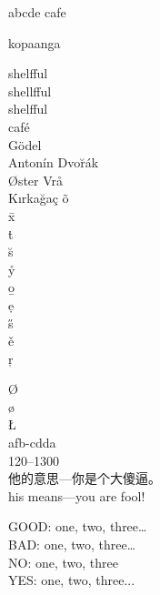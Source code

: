 \documentclass[UTF8]{article} %
\begin{document}
	\textgreek{abcde} %
cafe
	
	{\selectfont kopaanga}
	
	shelfful \\  %
	shellf{}ful\\
	shelf\/ful\\
	
	
	
	caf\'e\\
	G\"odel\\
	Anton\'in Dvo\u{r}\'ak\\
	\O ster Vr\r{a}\\
	K\i rka\u{g}a\c{c}
	\~o\\
	\=x\\
	\.t\\
	\u{s}\\
	\r{y}\\
	\b{o}\\
	\d{e}\\
	\H{s}\\
	\v{e}\\
	\c{r}
	
	\O \\
	\o \\
	\L \\
	
	afb-cdda\\
	120--1300\\
	他的意思{---}你是个大傻逼。\\%
	his means---you are fool!
	
	GOOD: one, two, three\ldots \\
	BAD: one, two, three\dots \\
	NO: one, two, three\textellipsis \\
	YES: one, two, three...
	
	
	
\end{document}
